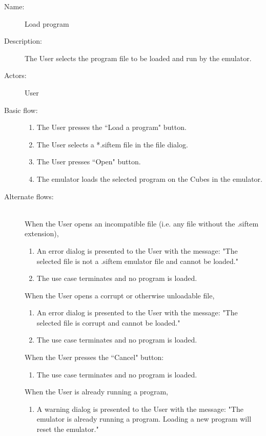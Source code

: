 \documentclass[12pt]{article}
\begin{document}
    \begin{description}
      \item[Name:] Load program
      \item[Description:] The User selects the program file to be loaded and run by the emulator.
      \item[Actors:] User
      \item[Basic flow:] \hfill 
        \begin{enumerate}
	  \item{The User presses the ``Load a program" button.}
	  \item{The User selects a *.siftem file in the file dialog.}
	  \item{The User presses ``Open" button.}
	  \item{The emulator loads the selected program on the Cubes in the emulator.}
        \end{enumerate}
      \item[Alternate flows:] \hfill \\
	When the User opens an incompatible file (i.e. any file without the .siftem extension),
        \begin{enumerate}
			\item{An error dialog is presented to the User with the message: "The selected file is not a .siftem emulator file and cannot be loaded."}
			\item{The use case terminates and no program is loaded.}
        \end{enumerate}
	When the User opens a corrupt or otherwise unloadable file,
        \begin{enumerate}
			\item{An error dialog is presented to the User with the message: "The selected file is corrupt and cannot be loaded."}
			\item{The use case terminates and no program is loaded.}
        \end{enumerate}
	When the User presses the ``Cancel" button:
        \begin{enumerate}
			\item{The use case terminates and no program is loaded.}
        \end{enumerate}
	When the User is already running a program,
		\begin{enumerate}
			\item{A warning dialog is presented to the User with the message: "The emulator is already running a program. Loading a new program will reset the emulator."}

\end{enumerate}
\end{description}
\end{document}
